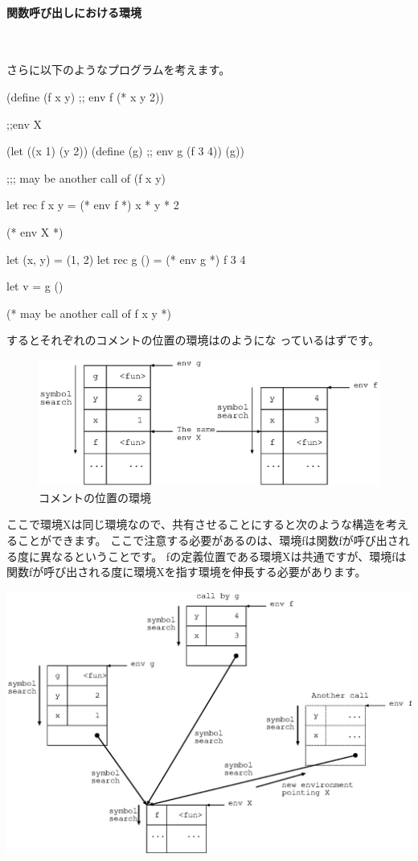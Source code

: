 \documentclass[mingoth,a4paper]{jsarticle}
\begin{document}
\paragraph{関数呼び出しにおける環境} \ 

さらに以下のようなプログラムを考えます。

\begin{commandline}
(define (f x y)
  ;; env f
  (* x y 2))

;;env X

(let ((x 1) (y 2))
  (define (g)
    ;; env g
    (f 3 4))
  (g))

;;; may be another call of (f x y)
\end{commandline}

\begin{commandline}
let rec f x y =
  (* env f *)
  x * y * 2

(* env X *)

let (x, y) = (1, 2)
let rec g () =
  (* env g *)
  f 3 4

let v = g ()

(* may be another call of f x y *)
\end{commandline}

するとそれぞれのコメントの位置の環境はのようにな
っているはずです。

\begin{figure}[h]
 \centering
 \includegraphics[height=0.25\hsize]{image201002/caml-env005.eps}
 \caption{コメントの位置の環境}
 \label{fig:caml-env005}
\end{figure}



ここで環境Xは同じ環境なので、共有させることにすると次のような構造を考えることができます。
ここで注意する必要があるのは、環境fは関数fが呼び出される度に異なるということです。
fの定義位置である環境Xは共通ですが、環境fは関数fが呼び出される度に環境Xを指す環境を伸長する必要があります。

 \includegraphics[height=0.5\hsize]{image201002/caml-env01.eps}
\end{document}
